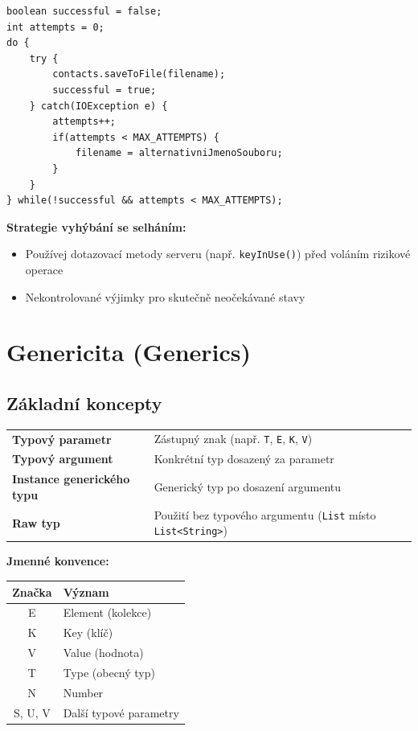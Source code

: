 \documentclass[11pt,a4paper]{article}
\begin{document}
\begin{verbatim}
boolean successful = false;
int attempts = 0;
do {
    try {
        contacts.saveToFile(filename);
        successful = true;
    } catch(IOException e) {
        attempts++;
        if(attempts < MAX_ATTEMPTS) {
            filename = alternativniJmenoSouboru;
        }
    }
} while(!successful && attempts < MAX_ATTEMPTS);
\end{verbatim}

\textbf{Strategie vyhýbání se selháním:}
\begin{itemize}
    \item Používej dotazovací metody serveru (např. \texttt{keyInUse()}) před voláním rizikové operace
    \item Nekontrolované výjimky pro skutečně neočekávané stavy
\end{itemize}

\section{Genericita (Generics)}

\subsection{Základní koncepty}

\begin{tcolorbox}[defbox,title=Terminologie genericity]
\begin{tabular}{ll}
\textbf{Typový parametr} & Zástupný znak (např. \texttt{T}, \texttt{E}, \texttt{K}, \texttt{V}) \\
\textbf{Typový argument} & Konkrétní typ dosazený za parametr \\
\textbf{Instance generického typu} & Generický typ po dosazení argumentu \\
\textbf{Raw typ} & Použití bez typového argumentu (\texttt{List} místo \texttt{List<String>}) \\
\end{tabular}
\end{tcolorbox}

\textbf{Jmenné konvence:}
\begin{center}
\begin{tabular}{cl}
\toprule
\textbf{Značka} & \textbf{Význam} \\
\midrule
E & Element (kolekce) \\
K & Key (klíč) \\
V & Value (hodnota) \\
T & Type (obecný typ) \\
N & Number \\
S, U, V & Další typové parametry \\
\bottomrule
\end{tabular}
\end{center}
\end{document}
